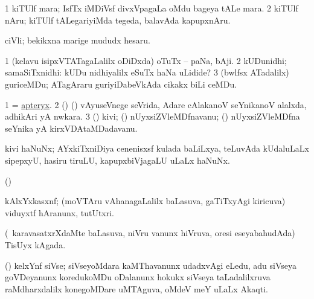\bentry
{}
\gl{\nA}
\bmng
\bnum
\num{1} kiTUlf mara; IsfTx iMDiVsf divxVpagaLa oMdu bageya tALe mara. 
\num{2} kiTUlf nAru; kiTUlf tALegariyiMda tegeda, balavAda kapupxnAru. 
\enum
\emng
\eentry

\bentry
{}
\gl{\nA}
\bmng
ciVli; bekikxna marige mududx hesaru. 
\emng
\eentry

\bentry
{}
\gl{\nA}
\bmng
\bnum
\num{1} (kelavu isipxVTATagaLalilx oDiDxda) oTuTx -- paNa, bAji. 
\num{2} kUDunidhi; samaSiTxnidhi:  kUDu nidhiyalilx eSuTx haNa uLidide? 
\num{3} (bwlfsx ATadalilx) guriceMDu; ATagAraru guriyiDabeVkAda cikakx biLi ceMDu. 
\enum
\emng
\eentry

\bentry
{}
\gl{\nA}
\bmng
\bnum
\num{1} = \hyperref{kandict_a.pdf}{A}{apteryx}{apteryx}. 
\num{2} (\birx) (\ashi) vAyuseVnege seVrida, Adare cAlakanoV seYnikanoV alalxda, adhikAri yA nwkara. 
\num{3} () kivi; (\AmA) nUyxsiZVleMDfnavanu; (\kanmu) nUyxsiZVleMDfna seYnika yA kirxVDAtaMDadavanu. 
\enum
\emng

\noindent
\gl{\pagu}
\bmng
{}  kivi haNuNx; AYxkiTxniDiya cenenisxsf kulada baLiLxya, teLuvAda kUdaluLaLx sipepxyU, hasiru tiruLU, kapupxbiVjagaLU uLaLx haNuNx. 
\emng
\eentry

\bentry
{}
\gl{\saMkiSx}
\bmng
{} 
\emng
\eentry

\bentry
{}
\gl{\saMkiSx}
\bmng
(\ame)  
\emng
\eentry

\bentry
{}
\gl{\saMkiSx}
\bmng
{} 
\emng
\eentry

\bentry
{}
\gl{\nA}
\bmng
kAlxYxkasxnf; (moVTAru vAhanagaLalilx baLasuva, gaTiTxyAgi kiricuva) viduyxtf hAranunx, tutUtxri. 
\emng
\eentry

\bentry
{}
\gl{\nA}
\bmng
(\kanmu\ karavasatxrXdaMte baLasuva, niVru \mo vanunx hiVruva, oresi eseyabahudAda) TisUyx kAgada. 
\emng
\eentry

\bentry
{}
\gl{\nA}
\bmng
(\ga) kelxYnf siVse; siVseyoMdara kaMThavanunx udadxvAgi eLedu, adu siVseya goVDeyanunx koredukoMDu oDalanunx hokukx siVseya taLadalilxruva raMdharxdalilx konegoMDare uMTAguva, oMdeV meY uLaLx Akaqti. 
\emng
\eentry

